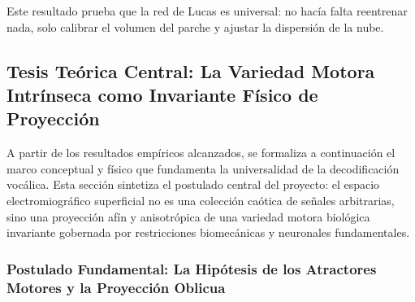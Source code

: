 \documentclass[11pt,a4paper,openany]{book}
\theoremstyle{definition}
\begin{document}
Este resultado prueba que la red de Lucas es universal: no hacía falta reentrenar nada, solo calibrar el volumen del parche y ajustar la dispersión de la nube.

\subsection{Tesis Teórica Central: La Variedad Motora Intrínseca como Invariante Físico de Proyección}
\label{subsec:tesis_teorica_variedad_intrinseca}

A partir de los resultados empíricos alcanzados, se formaliza a continuación el marco conceptual y físico que fundamenta la universalidad de la decodificación vocálica. Esta sección sintetiza el postulado central del proyecto: el espacio electromiográfico superficial no es una colección caótica de señales arbitrarias, sino una proyección afín y anisotrópica de una variedad motora biológica invariante gobernada por restricciones biomecánicas y neuronales fundamentales.

\subsubsection{Postulado Fundamental: La Hipótesis de los Atractores Motores y la Proyección Oblicua}
\label{subsubsec:postulado_fundamental_hipotesis}
\end{document}
